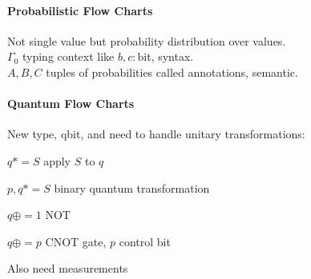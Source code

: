 \documentclass[10pt]{report}
\begin{document}
\paragraph{Probabilistic Flow Charts} Not single value but probability distribution over values.\\
$\Gamma_0$ typing context like $b,c:$bit, syntax.\\
$A,B,C$ tuples of probabilities called annotations, semantic.
\paragraph{Quantum Flow Charts} New type, qbit, and need to handle unitary transformations:
\begin{list}{}{}
	\item $q*=S$ apply $S$ to $q$
	\item $p,q*=S$ binary quantum transformation
	\item $q\oplus =1$ NOT
	\item $q\oplus =p$ CNOT gate, $p$ control bit
\end{list}
Also need measurements %
\end{document}

